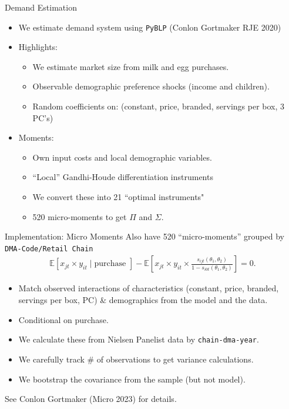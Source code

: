 \begin{frame}[plain,label=maindemand]{Demand Estimation}
\begin{itemize}
\item We estimate demand system using \texttt{PyBLP} (Conlon Gortmaker RJE 2020)
\item Highlights:
\begin{itemize}
\item We estimate market size from milk and egg purchases.
\item Observable demographic preference shocks (income and children).
\item Random coefficients on: (constant, price, branded, servings per box, 3 PC's)
\end{itemize}
\item Moments:
\begin{itemize}
\item Own input costs and local demographic variables.
\item ``Local'' Gandhi-Houde differentiation instruments
\item We convert these into 21 ``optimal instruments"
\item 520 micro-moments to get $\Pi$ and $\Sigma$.
\end{itemize}
\end{itemize}
\end{frame}


\begin{frame}{Implementation: Micro Moments}
Also have 520 ``micro-moments'' grouped by \texttt{DMA-Code/Retail Chain}
\begin{align*}
\mathbb{E} \left[x_{jt} \times y_{it} \mid \text{purchase } \right] 
- \mathbb{E}\left[x_{jt} \times y_{it}  \times \frac{s_{ijt}(\theta_1,\theta_2)}{1-s_{i0t}(\theta_1,\theta_2)}  \right] = 0.
\end{align*}
\begin{itemize}
\item Match observed interactions of characteristics (constant, price, branded, servings per box, PC) \& demographics from the model and the data.
\item Conditional on purchase.
\item We calculate these from Nielsen Panelist data by \texttt{chain-dma-year}.
\item We carefully track \# of observations to get variance calculations.
\item We bootstrap the covariance from the sample (but not model).
\end{itemize}
See Conlon Gortmaker (Micro 2023) for details.
\end{frame}

